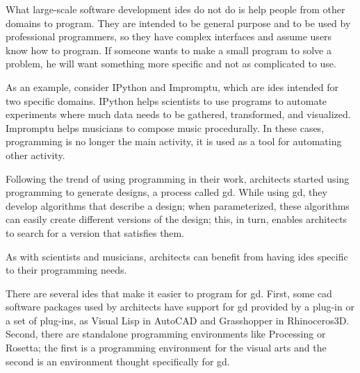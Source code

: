 \documentclass{./llncs2e/llncs}
\begin{document}
	What large-scale software development \acp{ide} do not do is help people from other domains to program.
	They are intended to be general purpose and to be used by professional programmers, so they have complex interfaces and assume users know how to program.
	If someone wants to make a small program to solve a problem, he will want something more specific and not as complicated to use.
	
	As an example, consider IPython and Impromptu, which are \acp{ide} intended for two specific domains.
	IPython helps scientists to use programs to automate experiments where much data needs to be gathered, transformed, and visualized.
	Impromptu helps musicians to compose music procedurally.
	In these cases, programming is no longer the main activity, it is used as a tool for automating other activity.

	Following the trend of using programming in their work, architects started using programming to generate designs, a process called \acf{gd}\cite{terzidis2003expressive,Maeda:2001:DN:559503}.
	While using \ac{gd}, they develop algorithms that describe a design; when parameterized, these algorithms can easily create different versions of the design; this, in turn, enables architects to search for a version that satisfies them.
	
	As with scientists and musicians, architects can benefit from having \acp{ide} specific to their programming needs.

	There are several \acp{ide} that make it easier to program for \ac{gd}. 
	First, some \ac{cad} software packages used by architects have support for \ac{gd} provided by a plug-in or a set of plug-ins, as Visual Lisp in AutoCAD and Grasshopper in Rhinoceros3D.
	Second, there are standalone programming environments like Processing\cite{reas2007processing} or Rosetta\cite{de2012modern}; the first is a programming environment for the visual arts and the second is an environment thought specifically for \ac{gd}.
	
\end{document}
